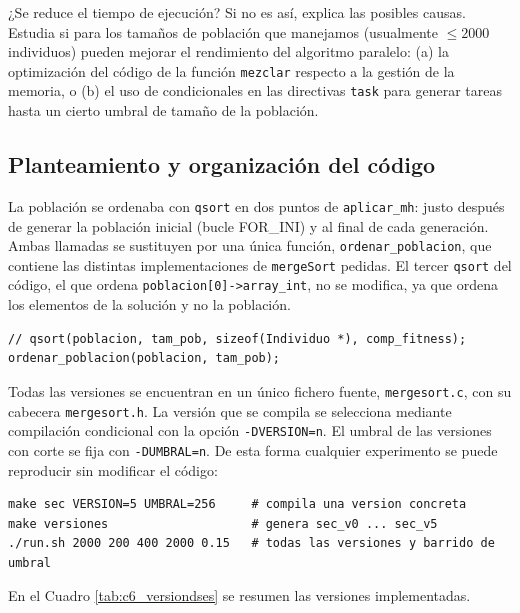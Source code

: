 \documentclass[12pt]{article}
\begin{document}
\begin{enumerate}
¿Se reduce el tiempo de ejecución? Si no es así, explica las posibles causas. Estudia si para los tamaños de población que manejamos (usualmente $\le 2000$ individuos) pueden mejorar el rendimiento del algoritmo paralelo: (a) la optimización del código de la función \texttt{mezclar} respecto a la gestión de la memoria, o (b) el uso de condicionales en las directivas \texttt{task} para generar tareas hasta un cierto umbral de tamaño de la población.


\subsection*{Planteamiento y organización del código}
 
La población se ordenaba con \texttt{qsort} en dos puntos de \texttt{aplicar\_mh}: justo después de generar la población inicial (bucle FOR\_INI) y al final de cada generación. Ambas llamadas se sustituyen por una única función, \texttt{ordenar\_poblacion}, que contiene las distintas implementaciones de \texttt{mergeSort} pedidas. El tercer \texttt{qsort} del código, el que ordena \texttt{poblacion[0]->array\_int}, no se modifica, ya que ordena los elementos de la solución y no la población.
 
\begin{lstlisting}[style=EstiloC]
// qsort(poblacion, tam_pob, sizeof(Individuo *), comp_fitness);
ordenar_poblacion(poblacion, tam_pob);
\end{lstlisting}
 
Todas las versiones se encuentran en un único fichero fuente, \texttt{mergesort.c}, con su cabecera \texttt{mergesort.h}. La versión que se compila se selecciona mediante compilación condicional con la opción \texttt{-DVERSION=n}. El umbral de las versiones con corte se fija con \texttt{-DUMBRAL=n}. De esta forma cualquier experimento se puede reproducir sin modificar el código:
 
\begin{lstlisting}[style=EstiloValgrind]
make sec VERSION=5 UMBRAL=256     # compila una version concreta
make versiones                    # genera sec_v0 ... sec_v5
./run.sh 2000 200 400 2000 0.15   # todas las versiones y barrido de umbral
\end{lstlisting}
 
En el Cuadro \ref{tab:c6_versiondses} se resumen las versiones implementadas.
 

\end{enumerate}
\end{document}
